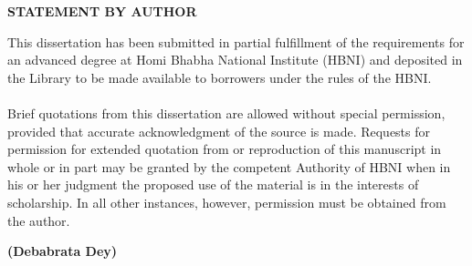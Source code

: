 \begin{center}
\large \bf
STATEMENT BY AUTHOR
\end{center}
This dissertation has been submitted in partial fulfillment of the requirements
for an advanced degree at Homi Bhabha National Institute (HBNI) and deposited
in the Library to be made available to borrowers under the rules of the HBNI.
\paragraph{}
Brief quotations from this dissertation are allowed without special
permission, provided that accurate acknowledgment of the source is made.
Requests for permission for extended  quotation from or reproduction
of this manuscript in whole or in part may be granted by the competent
Authority of HBNI when in his or her judgment the proposed use of the
material is in the interests of scholarship. In all other instances,
however, permission must be obtained from the author.
\vspace{1.2cm}
\begin{flushright}
	\textbf{(Debabrata Dey)}
\end{flushright}
